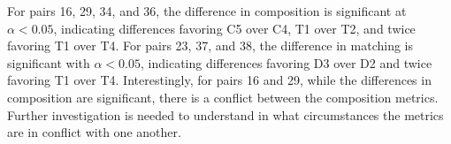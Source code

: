 %
%
%
%
%




For pairs 16, 29, 34, and 36, the difference in composition is significant at $\alpha < 0.05$, indicating differences favoring C5 over C4, T1 over T2, and twice favoring T1 over T4.
For pairs 23, 37, and 38, the difference in matching is significant with $\alpha < 0.05$, indicating differences favoring D3 over D2 and twice favoring T1 over T4.
Interestingly, for pairs 16 and 29, while the differences in composition are significant, there is a conflict between the composition metrics. Further investigation is needed to understand in what circumstances the metrics are in conflict with one another.




